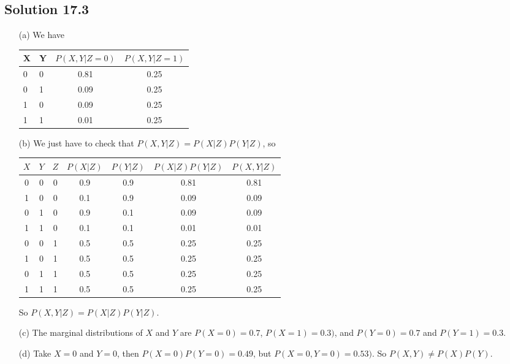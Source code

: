 \subsection*{Solution 17.3}

\begin{itemize}
    \item[(a)]
        We have
        \begin{table}[H]
            \centering
            \begin{tabular}{l|l||c|c}
                X & Y & $P(X,Y|Z=0)$ & $P(X,Y|Z=1)$ \\ \hline \hline
                0 & 0 & 0.81         & 0.25         \\ \hline
                0 & 1 & 0.09         & 0.25         \\ \hline
                1 & 0 & 0.09         & 0.25         \\ \hline
                1 & 1 & 0.01         & 0.25
            \end{tabular}
        \end{table}
    \item[(b)] We just have to check that $P(X,Y|Z) = P(X|Z)P(Y|Z)$, so
        \begin{table}[H]
            \centering
            \begin{tabular}{c|c|c||c|c|c|c}
                $X$ & $Y$ & $Z$ & $P(X|Z)$ & $P(Y|Z)$ & $P(X|Z)P(Y|Z)$ & $P(X,Y|Z)$ \\ \hline \hline
                0   & 0   & 0   & 0.9      & 0.9      & 0.81           & 0.81       \\ \hline
                1   & 0   & 0   & 0.1      & 0.9      & 0.09           & 0.09       \\ \hline
                0   & 1   & 0   & 0.9      & 0.1      & 0.09           & 0.09       \\ \hline
                1   & 1   & 0   & 0.1      & 0.1      & 0.01           & 0.01       \\ \hline
                0   & 0   & 1   & 0.5      & 0.5      & 0.25           & 0.25       \\ \hline
                1   & 0   & 1   & 0.5      & 0.5      & 0.25           & 0.25       \\ \hline
                0   & 1   & 1   & 0.5      & 0.5      & 0.25           & 0.25       \\ \hline
                1   & 1   & 1   & 0.5      & 0.5      & 0.25           & 0.25
            \end{tabular}
        \end{table}
        So $P(X,Y|Z) = P(X|Z)P(Y|Z)$.
    \item[(c)] The marginal distributions of $X$ and $Y$ are $P(X = 0) = 0.7$, $P(X = 1) = 0.3)$, and $P(Y = 0) = 0.7$ and $P(Y = 1) = 0.3$.
    \item[(d)] Take $X = 0$ and $Y = 0$, then $P(X=0)P(Y=0) = 0.49$, but $P(X=0,Y=0) = 0.53)$.
        So $P(X, Y) \neq P(X)P(Y)$.
\end{itemize}


